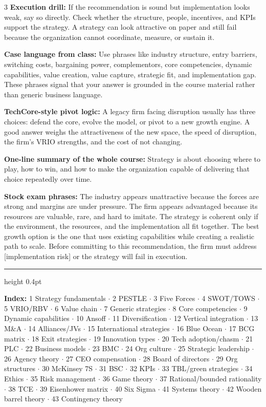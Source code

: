 \documentclass[7.6pt,letterpaper]{article}
\newcommand{\T}[1]{\textbf{\color{navy}#1}}
\begin{document}
\begin{multicols}{3}
\T{Execution drill:} If the recommendation is sound but implementation looks weak, say so directly. Check whether the structure, people, incentives, and KPIs support the strategy. A strategy can look attractive on paper and still fail because the organization cannot coordinate, measure, or sustain it.

\T{Case language from class:} Use phrases like industry structure, entry barriers, switching costs, bargaining power, complementors, core competencies, dynamic capabilities, value creation, value capture, strategic fit, and implementation gap. These phrases signal that your answer is grounded in the course material rather than generic business language.

\T{TechCore-style pivot logic:} A legacy firm facing disruption usually has three choices: defend the core, evolve the model, or pivot to a new growth engine. A good answer weighs the attractiveness of the new space, the speed of disruption, the firm's VRIO strengths, and the cost of not changing.

\T{One-line summary of the whole course:} Strategy is about choosing where to play, how to win, and how to make the organization capable of delivering that choice repeatedly over time.

\vspace{2pt}
\T{Stock exam phrases:}
The industry appears unattractive because the forces are strong and margins are under pressure.
The firm appears advantaged because its resources are valuable, rare, and hard to imitate.
The strategy is coherent only if the environment, the resources, and the implementation all fit together.
The best growth option is the one that uses existing capabilities while creating a realistic path to scale.
Before committing to this recommendation, the firm must address [implementation risk] or the strategy will fail in execution.

\vspace{2pt}
{\color{rule}\hrule height 0.4pt}
\vspace{2pt}
{\fontsize{5.8pt}{7pt}\sffamily\color{mid}
\T{Index:} 1 Strategy fundamentals $\cdot$ 2 PESTLE $\cdot$ 3 Five Forces $\cdot$ 4 SWOT/TOWS $\cdot$ 5 VRIO/RBV $\cdot$ 6 Value chain $\cdot$ 7 Generic strategies $\cdot$ 8 Core competencies $\cdot$ 9 Dynamic capabilities $\cdot$ 10 Ansoff $\cdot$ 11 Diversification $\cdot$ 12 Vertical integration $\cdot$ 13 M\&A $\cdot$ 14 Alliances/JVs $\cdot$ 15 International strategies $\cdot$ 16 Blue Ocean $\cdot$ 17 BCG matrix $\cdot$ 18 Exit strategies $\cdot$ 19 Innovation types $\cdot$ 20 Tech adoption/chasm $\cdot$ 21 PLC $\cdot$ 22 Business models $\cdot$ 23 BMC $\cdot$ 24 Org culture $\cdot$ 25 Strategic leadership $\cdot$ 26 Agency theory $\cdot$ 27 CEO compensation $\cdot$ 28 Board of directors $\cdot$ 29 Org structures $\cdot$ 30 McKinsey 7S $\cdot$ 31 BSC $\cdot$ 32 KPIs $\cdot$ 33 TBL/green strategies $\cdot$ 34 Ethics $\cdot$ 35 Risk management $\cdot$ 36 Game theory $\cdot$ 37 Rational/bounded rationality $\cdot$ 38 TCE $\cdot$ 39 Eisenhower matrix $\cdot$ 40 Six Sigma $\cdot$ 41 Systems theory $\cdot$ 42 Wooden barrel theory $\cdot$ 43 Contingency theory}


\end{multicols}
\end{document}
